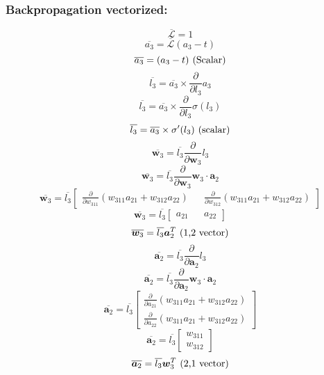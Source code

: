 \documentclass{article}
\begin{document}
\subsubsection{Backpropagation vectorized:}
\begin{equation}\overline{\mathcal{L}} = 1\end{equation}
\[\overline{a_3} = \overline{\mathcal{L}} (a_3 - t)\]
\[\overline{a_3} = (a_3 - t) \hspace*{0.125cm}(\text{Scalar})\]
\[\overline{l_3} = \overline{a_3} \times \frac{\partial}{\partial{l_3}} a_3\]
\[\overline{l_3} = \overline{a_3} \times \frac{\partial}{\partial{l_3}} \sigma(l_3)\]
\begin{equation}\overline{l_3} = \overline{a_3} \times \sigma ' (l_3) \hspace*{0.125cm} (\text{scalar})\end{equation}
\[\overline{\bm{w}_3} = \overline{l_3} \frac{\partial}{\partial{\bm{w}_3}} l_3\]
\[\overline{\bm{w}_3} = \overline{l_3} \frac{\partial}{\partial{\bm{w}_3}} \bm{w}_3 \cdot \bm{a}_2\]
\[\overline{\bm{w}_3} = \overline{l_3} \begin{bmatrix}\frac{\partial{}}{\partial{w_{311}}} (w_{311}a_{21} + w_{312}a_{22}) && \frac{\partial}{\partial{w_{312}}}(w_{311}a_{21} + w_{312}a_{22})\end{bmatrix}\]
\[\overline{\bm{w}_3} = \overline{l_3} \begin{bmatrix}a_{21} && a_{22}\end{bmatrix}\]
\begin{equation}\overline{\bm{w}_3} = \overline{l_3} \bm{a}_2^T \hspace*{0.125cm} (\text{1,2 vector})\end{equation}
\[\overline{\bm{a}_2} = \overline{l_3} \frac{\partial}{\partial{\bm{a}_2}} l_3\]
\[\overline{\bm{a}_2} = \overline{l_3} \frac{\partial}{\partial{\bm{a}_2}} \bm{w}_3 \cdot \bm{a}_2\]
\[\overline{\bm{a}_2} = \overline{l_3} \begin{bmatrix}\frac{\partial{}}{\partial{a_{21}}} (w_{311}a_{21} + w_{312}a_{22})\\ \frac{\partial}{\partial{a_{22}}}(w_{311}a_{21} + w_{312}a_{22})\end{bmatrix}\]
\[\overline{\bm{a}_2} = \overline{l_3} \begin{bmatrix}w_{311} \\ w_{312}\end{bmatrix}\]
\begin{equation}\overline{\bm{a}_2} = \overline{l_3} \bm{w}_3^T \hspace*{0.125cm} (\text{2,1 vector})\end{equation}
\end{document}
